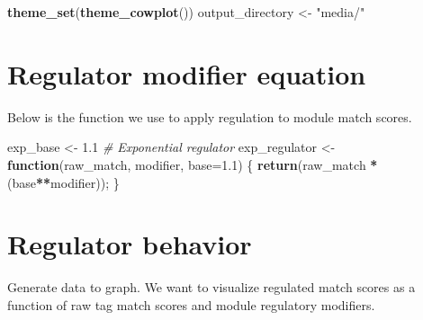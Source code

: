 \documentclass[
]{book}
\newenvironment{Shaded}{\begin{snugshade}}{\end{snugshade}}
\newcommand{\CommentTok}[1]{\textcolor[rgb]{0.56,0.35,0.01}{\textit{#1}}}
\newcommand{\ControlFlowTok}[1]{\textcolor[rgb]{0.13,0.29,0.53}{\textbf{#1}}}
\newcommand{\DataTypeTok}[1]{\textcolor[rgb]{0.13,0.29,0.53}{#1}}
\newcommand{\DecValTok}[1]{\textcolor[rgb]{0.00,0.00,0.81}{#1}}
\newcommand{\FloatTok}[1]{\textcolor[rgb]{0.00,0.00,0.81}{#1}}
\newcommand{\KeywordTok}[1]{\textcolor[rgb]{0.13,0.29,0.53}{\textbf{#1}}}
\newcommand{\NormalTok}[1]{#1}
\newcommand{\OperatorTok}[1]{\textcolor[rgb]{0.81,0.36,0.00}{\textbf{#1}}}
\newcommand{\StringTok}[1]{\textcolor[rgb]{0.31,0.60,0.02}{#1}}
\begin{document}
\begin{Shaded}
\begin{Highlighting}[]
\KeywordTok{theme\_set}\NormalTok{(}\KeywordTok{theme\_cowplot}\NormalTok{())}
\NormalTok{output\_directory \textless{}{-}}\StringTok{ "media/"}
\end{Highlighting}
\end{Shaded}

\hypertarget{regulator-modifier-equation}{%
\section{Regulator modifier equation}\label{regulator-modifier-equation}}

Below is the function we use to apply regulation to module match scores.

\begin{Shaded}
\begin{Highlighting}[]
\NormalTok{exp\_base \textless{}{-}}\StringTok{ }\FloatTok{1.1}
\CommentTok{\# Exponential regulator}
\NormalTok{exp\_regulator \textless{}{-}}\StringTok{ }\ControlFlowTok{function}\NormalTok{(raw\_match, modifier, }\DataTypeTok{base=}\FloatTok{1.1}\NormalTok{) \{}
  \KeywordTok{return}\NormalTok{(raw\_match }\OperatorTok{*}\StringTok{ }\NormalTok{(base}\OperatorTok{**}\NormalTok{modifier));}
\NormalTok{\}}
\end{Highlighting}
\end{Shaded}

\hypertarget{regulator-behavior}{%
\section{Regulator behavior}\label{regulator-behavior}}

Generate data to graph. We want to visualize regulated match scores as a function of raw tag match scores and module regulatory modifiers.

\begin{Shaded}
\end{Shaded}
\end{document}
